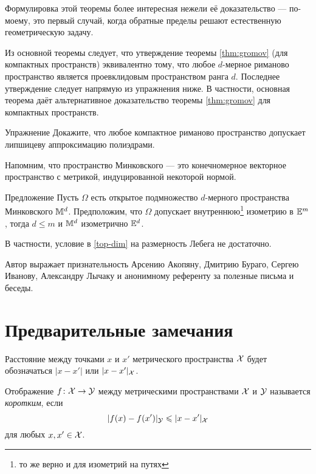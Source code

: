 \documentclass[oneside,a4paper]{article}
\begin{document}
Формулировка этой теоремы более интересная нежели её доказательство ---  по-моему, это первый случай, когда обратные пределы решают естественную геометрическую задачу.

Из основной теоремы следует, что утверждение теоремы \ref{thm:gromov} (для компактных пространств) эквивалентно 
тому, что любое $d$-мерное риманово пространство является проевклидовым пространством ранга $d$.
Последнее утверждение следует напрямую из упражнения ниже.
В частности, основная теорема даёт альтернативное доказательство теоремы  \ref{thm:gromov} для компактных пространств.

\begin{thm}{Упражнение}
Докажите, что любое компактное риманово пространство допускает липшицеву аппроксимацию полиэдрами.
\end{thm}


Напомним, что пространство Минковского --- это конечномерное векторное пространство с метрикой, индуцированной некоторой нормой.

\begin{thm}{Предложение}\label{minkowski}
Пусть $\Omega$ есть открытое подмножество $d$-мерного пространства Минковского $\mathbb{M}^d$.
Предположим, что $\Omega$ допускает внутреннюю\footnote{то же верно и для изометрий на путях} изометрию в $\mathbb{E}^m$, тогда $d\le m$ и $\mathbb{M}^d$ изометрично $\mathbb{E}^d$.
\end{thm}
В частности, условие в \ref{top-dim} на размерность Лебега не достаточно.

\smallskip

{\sloppy

Автор выражает признательность Арсению Акопяну, Дмитрию Бураго, Сергею Иванову, Александру Лычаку и анонимному референту за полезные письма и беседы.

}






\section{Предварительные замечания}\label{preliminaries}

Расстояние между точками $x$ и $x'$ метрического пространства $\mathcal{X}$ будет обозначаться $|x -x'|$ или $|x -x'|_{\mathcal{X}}$.

Отображение $f\colon\mathcal{X}\to \mathcal{Y}$ между метрическими пространствами $\mathcal{X}$ и $\mathcal{Y}$ называется \emph{коротким},
если  
$$|f(x)-f(x')|_{\mathcal{Y}}\leqslant |x -x'|_{\mathcal{X}}$$
для любых $x,x'\in \mathcal{X}$.
\end{document}
